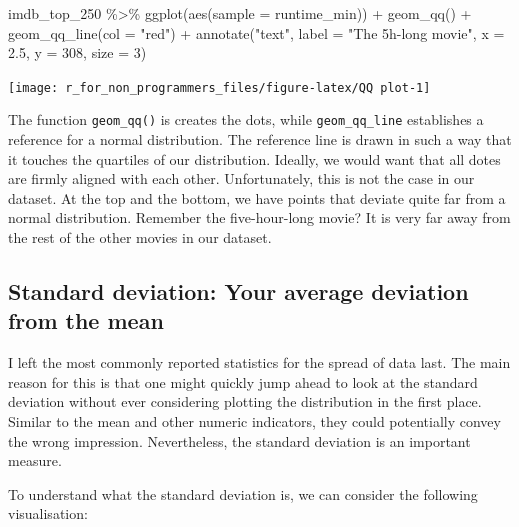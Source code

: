 \documentclass[
]{book}
\newenvironment{Shaded}{\begin{snugshade}}{\end{snugshade}}
\newcommand{\AttributeTok}[1]{\textcolor[rgb]{0.77,0.63,0.00}{#1}}
\newcommand{\DecValTok}[1]{\textcolor[rgb]{0.00,0.00,0.81}{#1}}
\newcommand{\FloatTok}[1]{\textcolor[rgb]{0.00,0.00,0.81}{#1}}
\newcommand{\FunctionTok}[1]{\textcolor[rgb]{0.00,0.00,0.00}{#1}}
\newcommand{\NormalTok}[1]{#1}
\newcommand{\SpecialCharTok}[1]{\textcolor[rgb]{0.00,0.00,0.00}{#1}}
\newcommand{\StringTok}[1]{\textcolor[rgb]{0.31,0.60,0.02}{#1}}
\begin{document}
\begin{Shaded}
\begin{Highlighting}[]
\NormalTok{imdb\_top\_250 }\SpecialCharTok{\%\textgreater{}\%}
  \FunctionTok{ggplot}\NormalTok{(}\FunctionTok{aes}\NormalTok{(}\AttributeTok{sample =}\NormalTok{ runtime\_min)) }\SpecialCharTok{+}
  \FunctionTok{geom\_qq}\NormalTok{() }\SpecialCharTok{+}
  \FunctionTok{geom\_qq\_line}\NormalTok{(}\AttributeTok{col =} \StringTok{"red"}\NormalTok{) }\SpecialCharTok{+}
  \FunctionTok{annotate}\NormalTok{(}\StringTok{"text"}\NormalTok{,}
           \AttributeTok{label =} \StringTok{"The 5h{-}long movie"}\NormalTok{,}
           \AttributeTok{x =} \FloatTok{2.5}\NormalTok{,}
           \AttributeTok{y =} \DecValTok{308}\NormalTok{,}
           \AttributeTok{size =} \DecValTok{3}\NormalTok{)}
\end{Highlighting}
\end{Shaded}

\begin{center}\texttt{[image: r\_for\_non\_programmers\_files/figure-latex/QQ plot-1]} \end{center}

The function \texttt{geom\_qq()} is creates the dots, while \texttt{geom\_qq\_line} establishes a reference for a normal distribution. The reference line is drawn in such a way that it touches the quartiles of our distribution. Ideally, we would want that all dotes are firmly aligned with each other. Unfortunately, this is not the case in our dataset. At the top and the bottom, we have points that deviate quite far from a normal distribution. Remember the five-hour-long movie? It is very far away from the rest of the other movies in our dataset.

\hypertarget{standard-deviation}{%
\subsection{Standard deviation: Your average deviation from the mean}\label{standard-deviation}}

I left the most commonly reported statistics for the spread of data last. The main reason for this is that one might quickly jump ahead to look at the standard deviation without ever considering plotting the distribution in the first place. Similar to the mean and other numeric indicators, they could potentially convey the wrong impression. Nevertheless, the standard deviation is an important measure.

To understand what the standard deviation is, we can consider the following visualisation:
\end{document}

